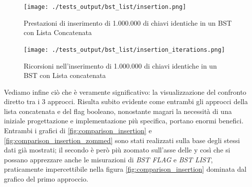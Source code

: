\documentclass{article}
\begin{document}
\begin{figure}[htbp]
 \begin{minipage}{0.5\textwidth}
    \centering
    \texttt{[image: ./tests\_output/bst\_list/insertion.png]}
    \caption{Prestazioni di inserimento di 1.000.000 di chiavi identiche in un BST con Lista Concatenata}
    \label{fig:bst-list-insetion}
  \end{minipage}
      \hspace{0.05\textwidth}
  \begin{minipage}{0.5\textwidth}
    \centering
    \texttt{[image: ./tests\_output/bst\_list/insertion\_iterations.png]}
    \caption{Ricorsioni nell'inserimento di 1.000.000 di chiavi identiche in un BST con Lista concatenata}
    \label{fig:bst-list-insetion-iterations}
  \end{minipage}%
\end{figure}



\begin{minipage}[t]{\linewidth}
\begin{multicols}{2}
\begin{minipage}{\linewidth}
    \centering
    \label{tab:bst-flag-insertion-summarised}
\end{minipage}

\columnbreak

\begin{minipage}{\linewidth}
    \centering
    \label{tab:bst-list-insertion-summarised}
\end{minipage}

\end{multicols}

\end{minipage}

\vspace{10px}

Vediamo infine ciò che è veramente significativo: la visualizzazione del confronto diretto tra i 3 approcci.
Risulta subito evidente come entrambi gli approcci della lista concatenata e del flag booleano, nonostante magari la necessità di una iniziale progettazione e implementazione più specifica, portano enormi benefici. Entrambi i grafici di  {\cref{fig:comparison_insertion}} e {\cref{fig:comparison_insertion_zommed}} sono stati realizzati sulla base degli stessi dati già mostrati; il secondo è però più zoomato sull'asse delle y  così che si possano apprezzare anche le misurazioni di \textit{BST FLAG} e \textit{BST LIST}, praticamente impercettibile nella figura {\cref{fig:comparison_insertion}} dominata dal grafico del primo approccio.
\end{document}
